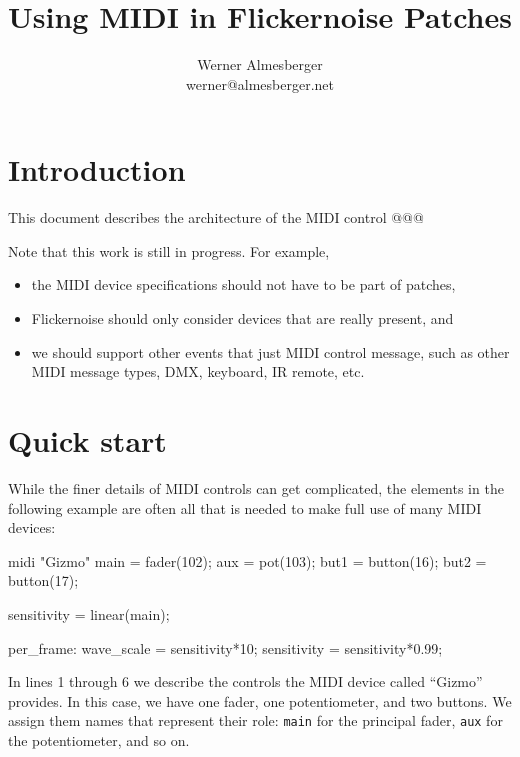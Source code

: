 \documentclass[11pt,a4paper]{article}
\begin{document}
\title{Using MIDI in Flickernoise Patches}
\author{Werner Almesberger \\
  {\normalsize werner@almesberger.net}}

\maketitle




\section{Introduction}

This document describes the architecture of the MIDI control @@@

Note that this work is still in progress. For example,
\begin{itemize}
  \item the MIDI device specifications should not have to be part of
    patches,
  \item Flickernoise should only consider devices that are really present, and
  \item we should support other events that just MIDI control message,
    such as other MIDI message types, DMX, keyboard, IR remote, etc.
\end{itemize}




\section{Quick start}

While the finer details of MIDI controls can get complicated, the
elements in the following example are often all that is needed to
make full use of many MIDI devices:

\begin{listing}{1}
midi "Gizmo" {
	main = fader(102);
	aux = pot(103);
	but1 = button(16);
	but2 = button(17);
}

sensitivity = linear(main);

per_frame:
	wave_scale = sensitivity*10;
	sensitivity = sensitivity*0.99;
\end{listing}

In lines 1 through 6 we describe the controls the MIDI device called
``Gizmo'' provides. In this case, we have one fader, one potentiometer,
and two buttons. We assign them names that represent their role: {\tt main}
for the principal fader, {\tt aux} for the potentiometer, and so on.
\end{document}
